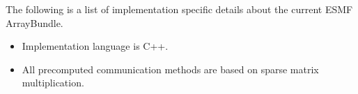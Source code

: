 

The following is a list of implementation specific details about the current ESMF ArrayBundle.

\begin{itemize}
\item Implementation language is C++.
\item All precomputed communication methods are based on sparse matrix
multiplication.
\end{itemize}
